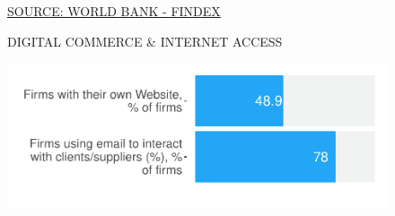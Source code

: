 \documentclass{article}\usepackage[]{graphicx}\usepackage[]{color}
\makeatletter
\def\maxwidth{ %
  \ifdim\Gin@nat@width>\linewidth
    \linewidth
  \else
    \Gin@nat@width
  \fi
}
\makeatother
\begin{document}
\begin{figure}
\begin{minipage}[c]{0.95\textwidth}
\begin{minipage}[b]{0.95\textwidth}
\begin{minipage}[c]{0.48\textwidth}
{}



      \vspace*{-0.6cm} 
      \scriptsize{\href{http://www.worldbank.org/en/programs/globalfindex}{\textcolor[HTML]{22A6F5}{SOURCE: WORLD BANK - FINDEX}}}
    \end{minipage}
    \begin{minipage}[c]{0.50\textwidth} %
      \small{\textcolor[HTML]{818181}{DIGITAL COMMERCE \& INTERNET ACCESS}}
      \\[8pt]
      \vspace{+5ex}    
      \begin{minipage}[c]{0.99\textwidth} %


{\centering \includegraphics[width=\maxwidth]{figure/bar_chart_Markets-1} 

}




\end{minipage}
\end{minipage}
\end{minipage}
\end{minipage}
\end{figure}
\end{document}

